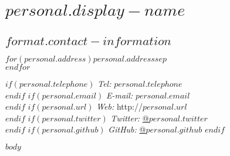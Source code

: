 \documentclass[%
  $if(format.pdf-options.memoir-mode.papersize)$
    $format.pdf-options.memoir-mode.papersize$paper,
  $endif$
  $format.pdf-options.memoir-mode.typesize$,
  oneside
  ]{memoir}
\date{$date$}
\newcommand\name{$personal.display-name$}
\newcommand\name{$personal.name$}
\begin{document}
    \chapter{\name}



  \hypertarget{contact-information}{
  \section{$format.contact-information$}\label{contact-information}}
    \begin{minipage}[t]{0.3\textwidth}
      $for(personal.address)$$personal.address$$sep$\\ $endfor$
    \end{minipage}
    \begin{minipage}[t]{0.7\textwidth}
        $if(personal.telephone)$
        {\textit{Tel:}} $personal.telephone$ \\
        $endif$
        $if(personal.email)$
        {\textit{E-mail:}} $personal.email$ \\
        $endif$
        $if(personal.url)$
        {\textit{Web:}} http://$personal.url$ \\
        $endif$
        $if(personal.twitter)$
        {\textit{Twitter:}} \href{http://twitter.com/$personal.twitter$}{@$personal.twitter$} \\
        $endif$
        $if(personal.github)$
        {\textit{GitHub:}} \href{http://github.com/$personal.github$}{@$personal.github$}
        $endif$
    \end{minipage}
\vspace{-\baselineskip} %
$body$
\end{document}

